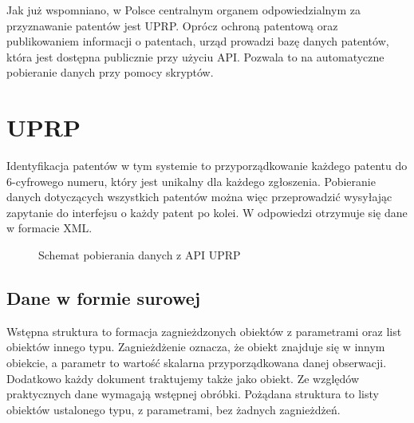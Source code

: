 Jak już wspomniano, w Polsce centralnym organem odpowiedzialnym
za przyznawanie patentów jest \acf{UPRP}. Oprócz ochroną patentową
oraz publikowaniem informacji o patentach, urząd prowadzi
bazę danych patentów, która jest dostępna publicznie przy użyciu \ac{API}.
Pozwala to na automatyczne pobieranie danych przy pomocy skryptów.

\section{\ac{UPRP}}\label{sec:UPRP}

Identyfikacja patentów w tym systemie to przyporządkowanie
każdego patentu do 6-cyfrowego numeru, który jest unikalny dla
każdego zgłoszenia. Pobieranie danych dotyczących wszystkich patentów 
można więc przeprowadzić wysyłając zapytanie do interfejsu o każdy
patent po kolei. W odpowiedzi otrzymuje się dane w formacie \ac{XML}.

\bigskip
\begin{figure}
\centering
{}
\caption{Schemat pobierania danych z \ac{API} \ac{UPRP}}
\end{figure}

\subsection{Dane w formie surowej}
\label{sec:profilowanie-UPRP}

Wstępna struktura to formacja zagnieżdzonych obiektów z parametrami 
oraz list obiektów innego typu. Zagnieżdżenie oznacza, że obiekt znajduje się
w innym obiekcie, a parametr to wartość skalarna przyporządkowana danej obserwacji.
Dodatkowo każdy dokument traktujemy także jako obiekt.
Ze względów praktycznych dane wymagają wstępnej obróbki.
Pożądana struktura to listy obiektów ustalonego typu, z parametrami, 
bez żadnych zagnieżdżeń.


